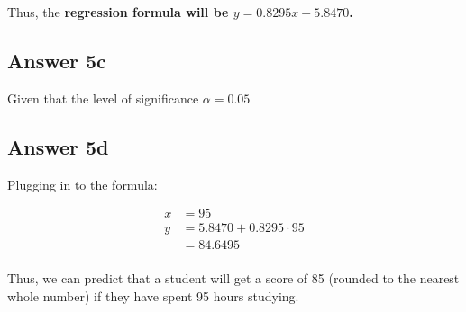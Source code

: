 \documentclass[
	11pt, %
]{assignment}
\begin{document}
Thus, the \textbf{regression formula will be \(y = 0.8295x + 5.8470\).}

\subsection*{Answer 5c}
Given that the level of significance \(\alpha = 0.05\)

\subsection*{Answer 5d}

Plugging in to the formula:

\[
	\begin{aligned}
		x &= 95\\
		y &= 5.8470 + 0.8295 \cdot 95\\
			&= 84.6495\\
	\end{aligned}
\]

Thus, we can predict that a student will get a score of 85 (rounded to the nearest whole number) if they have spent 95 hours studying.



% 

\end{document}
